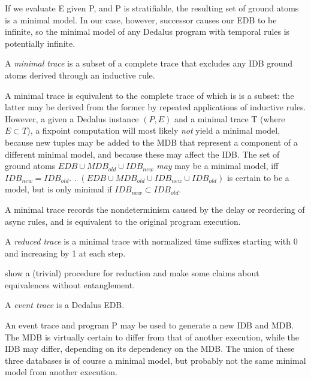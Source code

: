 
If we evaluate E given P, and P is stratifiable, the resulting set of ground atoms is a minimal model.
In our case, however, successor causes our EDB to be infinite, so the minimal model of any Dedalus program 
with temporal rules is potentially infinite.  


\begin{definition}
A \emph{minimal trace} is a subset of a complete trace that excludes any IDB ground atoms derived through an inductive
rule.
\end{definition}

A minimal trace is equivalent to the complete trace of which is is a subset: the latter may be derived from the former by repeated
applications of inductive rules.  However, a given a Dedalus instance $(P, E)$ and a minimal trace T (where $E \subset T$), a fixpoint
computation will most likely \emph{not} yield a minimal model, because new tuples may be added to the MDB that represent a component 
of a different minimal model, and because these may affect the IDB.  The set of ground atoms $EDB \cup MDB_{old} \cup IDB_{new}$
\emph{may} may be a minimal model, iff $IDB_{new} = IDB_{old}$.  .  
$(EDB \cup MDB_{old} \cup IDB_{new} \cup IDB_{old})$ is certain to be a model, but is only minimal if $IDB_{new} \subset IDB_{old}$.

A minimal trace records the nondeterminism caused by the delay or reordering of async rules, and
is equivalent to the original program execution.  

\begin{definition}
A \emph{reduced trace} is a minimal trace with normalized time suffixes starting with 0 and increasing by 1 at each step.
\end{definition}

show a (trivial) procedure for reduction and make some claims about equivalences without entanglement.

\begin{definition}
A \emph{event trace} is a Dedalus EDB.
\end{definition}

An event trace and program P may be used to generate a new IDB and MDB.  The MDB is virtually certain to differ from that of another
execution, while the IDB may differ, depending on its dependency on the MDB.  The union of these three databases is of course a
minimal model, but probably not the same minimal model from another execution.  



